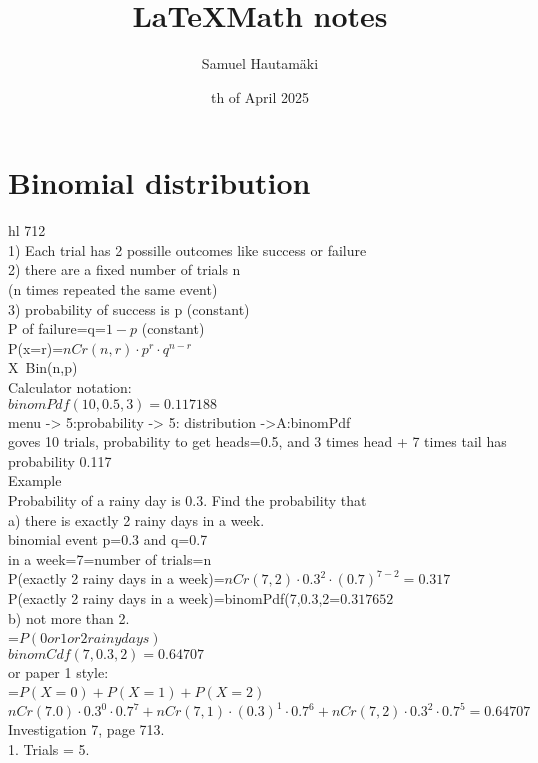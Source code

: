 \documentclass{article}
\title{\LaTeX Math notes}
\author{Samuel Hautamäki}
\date{th of April 2025}
\begin{document}
  \maketitle
   
  \section{Binomial distribution}
  hl 712\\ 
  1) Each trial has 2 possille outcomes like success or failure\\
  2) there are a fixed number of trials n\\
  (n times repeated the same event)\\
  3) probability of success is p (constant)\\
  P of failure=q=$1-p$ (constant)\\
  P(x=r)=$nCr(n,r)\cdot p^r\cdot q^{n-r}$\\
  X~Bin(n,p)\\
  Calculator notation:\\
  $binomPdf(10,0.5,3)=0.117188$\\
  menu -> 5:probability -> 5: distribution ->A:binomPdf\\
  goves 10 trials, probability to get heads=0.5, and 3 times head + 7 times tail has probability 0.117\\
  Example\\
  Probability of a rainy day is 0.3. Find the probability that\\
  a) there is exactly 2 rainy days in a week.\\
  binomial event p=0.3 and q=0.7\\
  in a week=7=number of trials=n\\
  P(exactly 2 rainy days in a week)=$nCr(7,2)\cdot0.3^2\cdot(0.7)^{7-2}=0.317$\\
  P(exactly 2 rainy days in a week)=binomPdf(7,0.3,2=$0.317652$\\
  b) not more than 2.\\
  =$P(0 or 1 or 2 rainy days)$\\
  $binomCdf(7,0.3,2)=0.64707$\\
  or paper 1 style:\\
  =$P(X=0)+P(X=1)+P(X=2)$\\
  $nCr(7.0)\cdot0.3^0\cdot 0.7^7+nCr(7,1)\cdot(0.3)^1\cdot0.7^6+nCr(7,2)\cdot 0.3^2\cdot 0.7^5=0.64707$\\
  Investigation 7, page 713.\\
  1. Trials = 5.\\
\end{document}
